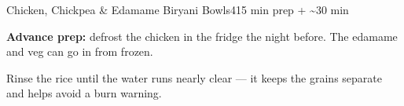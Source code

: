 \begin{recipebox}{Chicken, Chickpea \& Edamame Biryani Bowls}{4}{15 min prep + \textasciitilde30 min}
\begin{notelist}
  \item \textbf{Advance prep:} defrost the chicken in the fridge the night before. The edamame and veg can go in from frozen.
  \item Rinse the rice until the water runs nearly clear --- it keeps the grains separate and helps avoid a burn warning.
\end{notelist}

\end{recipebox}
